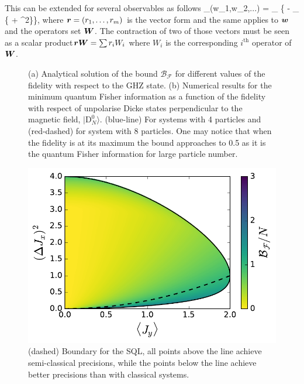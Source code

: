 This can be extended for several observables as follows
\be
  _{}(w_1,w_2,...) = \sup_{} \big\{  - \sup_{\ket{\psi}} \{ + ^2\}\big\},
\ee
where $\boldsymbol{r}=(r_1,\dots,r_m)$ is the vector form and the same applies to $\boldsymbol{w}$ and the operators set $\boldsymbol{W}$.
The contraction of two of those vectors must be seen as a scalar product\ie $\boldsymbol{rW}=\sum r_iW_i$ where $W_i$ is the corresponding $i^{\text{th}}$ operator of $\boldsymbol{W}$.

\begin{figure}
  \centering
  \caption{(a) Analytical solution of the bound $\mathcal{B}_{\mathcal{F}}$ for different values of the fidelity with respect to the GHZ state. (b) Numerical results for the minimum quantum Fisher information as a function of the fidelity with respect of unpolarise Dicke states perpendicular to the magnetic field, $|\text{D}_N^0\rangle$. (blue-line) For systems with 4 particles and (red-dashed) for system with 8 particles. One may notice that when the fidelity is at its maximum the bound approaches to 0.5 as it is the quantum Fisher information for large particle number.}
  \label{fig:vd-secuence-evo}
\end{figure}

\begin{figure}
  \centering
  \includegraphics[scale=.65]{img/plots/LT_spsq2d_4.pdf}
  \caption{(dashed) Boundary for the SQL, all points above the line achieve semi-classical precisions, while the points below the line achieve better precisions than with classical systems.}
  \label{fig:vd-secuence-evo}
\end{figure}

